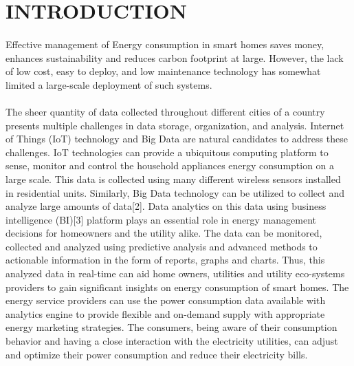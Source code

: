 \documentclass[a4paper,12pt,oneside]{article}
\begin{document}
\newpage
\begin{center}
\tableofcontents
\end{center}



\newpage
\thispagestyle{plain}
\begin{center}
\listoffigures
\end{center}



\newpage
\rfoot{\thepage}
\rfoot{\thepage}
\renewcommand{\headrulewidth}{0.0pt}
\renewcommand{\footrulewidth}{0.0pt}
\renewcommand{\headrulewidth}{0.0pt}
\renewcommand{\footrulewidth}{0.0pt}
\section{INTRODUCTION}
\paragraph{}
Effective management of Energy consumption in smart homes saves money,
enhances sustainability and reduces carbon footprint at
large. However, the lack of low cost, easy to deploy, and low
maintenance technology has somewhat limited a large-scale deployment of such systems.
\paragraph{}
The sheer quantity of data
collected throughout different cities of a country presents
multiple challenges in data storage, organization, and analysis.
Internet of Things (IoT) technology and Big Data are natural
candidates to address these challenges. IoT technologies can
provide a ubiquitous computing platform to sense, monitor
and control the household appliances energy consumption on a
large scale. This data is collected using many different
wireless sensors installed in residential units. Similarly, Big
Data technology can be utilized to collect and analyze large
amounts of data[2]. Data analytics on this data using business
intelligence (BI)[3] platform plays an essential role in energy
management decisions for homeowners and the utility alike.
The data can be monitored, collected and analyzed using
predictive analysis and advanced methods to actionable
information in the form of reports, graphs and charts. Thus,
this analyzed data in real-time can aid home owners, utilities
and utility eco-systems providers to gain significant insights
on energy consumption of smart homes. The energy service
providers can use the power consumption data available with
analytics engine to provide flexible and on-demand supply
with appropriate energy marketing strategies. The consumers,
being aware of their consumption behavior and having a close
interaction with the electricity utilities, can adjust and
optimize their power consumption and reduce their electricity
bills.
\end{document}
